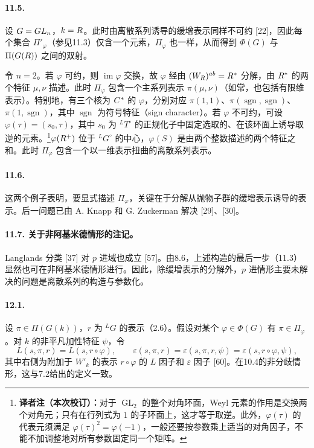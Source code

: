 \paragraph*{11.5.} 设 $G=GL_n$，$k=R$。此时由离散系列诱导的缓增表示同样不可约 [22]，因此每个集合 $\Pi'_\varphi$（参见11.3）仅含一个元素，$\Pi_\varphi$ 也一样，从而得到 $\Phi(G)$ 与 $\Pi(G(R))$ 之间的双射。

令 $n=2$。若 $\varphi$ 可约，则 $\operatorname{im}\varphi$ 交换，故 $\varphi$ 经由 $(W_{R})^{ab}=R^*$ 分解，由 $R^*$ 的两个特征 $\mu,\nu$ 描述。此时 $\Pi_\varphi$ 包含一个主系列表示 $\pi(\mu,\nu)$（如常，也包括有限维表示）。特别地，有三个核为 $C^*$ 的 $\varphi$，分别对应 $\pi(1,1)$、$\pi(\operatorname{sgn},\operatorname{sgn})$、$\pi(1,\operatorname{sgn})$，其中 $\operatorname{sgn}$ 为符号特征（sign character）。若 $\varphi$ 不可约，可设 $\varphi(\tau)=(s_0,\tau)$，其中 $s_0$ 为 ${}^LT^\circ$ 的正规化子中固定选取的、在该环面上诱导取逆的元素。\footnote{\textbf{译者注（本次校订）：}对于 $\operatorname{GL}_2$ 的整个对角环面，Weyl 元素的作用是交换两个对角元；只有在行列式为 $1$ 的子环面上，这才等于取逆。此外，$\varphi(\tau)$ 的代表元须满足 $\varphi(\tau)^2=\varphi(-1)$，一般还要按参数乘上适当的对角因子，不能不加调整地对所有参数固定同一个矩阵。}$\varphi(R^+)$ 位于 ${}^LG^\circ$ 的中心，$\varphi(S)$ 是由两个整数描述的两个特征之和。此时 $\Pi_\varphi$ 包含一个以一维表示扭曲的离散系列表示。

\paragraph*{11.6.} 这两个例子表明，要显式描述 $\Pi_\varphi$，关键在于分解从抛物子群的缓增表示诱导的表示。后一问题已由 A. Knapp 和 G. Zuckerman 解决 [29]、[30]。

\paragraph*{11.7. 关于非阿基米德情形的注记。}
Langlands 分类 [37] 对 $p$ 进域也成立 [57]。由8.6，上述构造的最后一步（11.3）显然也可在非阿基米德情形进行。因此，除缓增表示的分解外，$p$ 进情形主要未解决的问题是离散系列的构造与参数化。

\paragraph*{12.1.} 设 $\pi\in\Pi(G(k))$，$r$ 为 ${}^LG$ 的表示（2.6）。假设对某个 $\varphi\in\Phi(G)$ 有 $\pi\in\Pi_\varphi$。对 $k$ 的非平凡加性特征 $\psi$，令
\begin{equation}
 L(s,\pi,r)=L(s,r\circ\varphi),\qquad
 \varepsilon(s,\pi,r)=\varepsilon(s,\pi,r,\psi)=\varepsilon(s,r\circ\varphi,\psi),\tag{1}
\end{equation}
其中右侧为附加于 $W'_k$ 的表示 $r\circ\varphi$ 的 $L$ 因子和 $\varepsilon$ 因子 [60]。在10.4的非分歧情形，这与7.2给出的定义一致。

